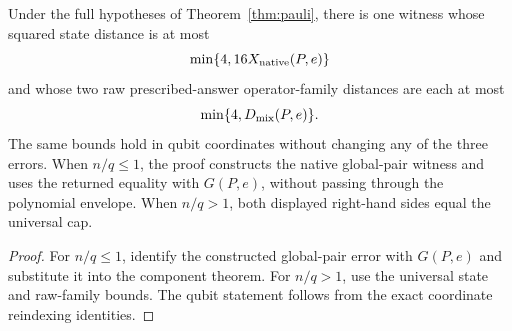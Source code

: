 \begin{theorem}
\label{thm:pauli-final-mixed-components}
\leanok
{}
Under the full hypotheses of Theorem~\ref{thm:pauli}, there is one witness
whose squared state distance is at most
\[
 \min\{4,16X_{\rm native}(P,e)\}
\]
and whose two raw prescribed-answer operator-family distances are each at most
\[
 \min\{4,D_{\rm mix}(P,e)\}.
\]
The same bounds hold in qubit coordinates without changing any of the three
errors.  When $n/q\leq1$, the proof constructs the native global-pair witness
and uses the returned equality with $G(P,e)$, without passing through the
polynomial envelope.  When $n/q>1$, both displayed right-hand sides equal the
universal cap.
\end{theorem}
\begin{proof}
\leanok
{}
For $n/q\leq1$, identify the constructed global-pair error with $G(P,e)$ and
substitute it into the component theorem.  For $n/q>1$, use the universal state
and raw-family bounds.  The qubit statement follows from the exact coordinate
reindexing identities.
\end{proof}

